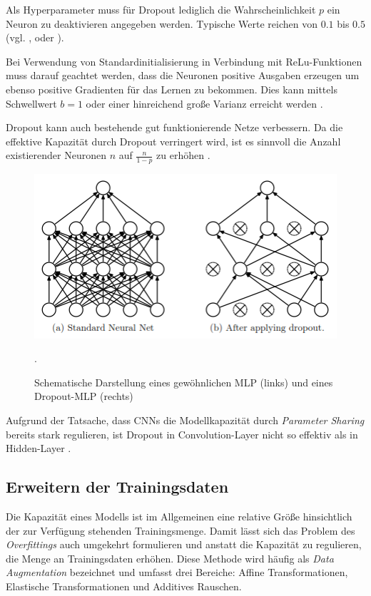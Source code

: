 Als Hyperparameter muss für Dropout lediglich die Wahrscheinlichkeit $p$ ein Neuron zu deaktivieren angegeben werden. Typische Werte reichen von $0.1$ bis $0.5$ (vgl. \cite{Krizhevsky2012}, \cite{Srivastava2014} oder \cite{Simonyan2014}).

Bei Verwendung von Standardinitialisierung in Verbindung mit ReLu-Funk\-tionen muss darauf geachtet werden, dass die Neuronen positive Ausgaben erzeugen um ebenso positive Gradienten für das Lernen zu bekommen. Dies kann mittels Schwellwert $b=1$ oder einer hinreichend große Varianz erreicht werden \cite[vgl.][]{Hinton2012}.

Dropout kann auch bestehende gut funktionierende Netze verbessern. Da die effektive Kapazität durch Dropout verringert wird, ist es sinnvoll die Anzahl existierender Neuronen $n$ auf $\frac{n}{1-p}$ zu erhöhen \cite[vgl.][]{Srivastava2014}.\\ 

\begin{figure}
\centering
\includegraphics[width=0.6\linewidth]{images/4_dropout}
\caption[]{Schematische Darstellung eines gewöhnlichen MLP (links) und eines Dropout-MLP (rechts) \cite[siehe][]{Srivastava2014}}.
\label{fig:4_dropout}
\end{figure}			
	
Aufgrund der Tatsache, dass CNNs die Modellkapazität durch \textit{Parameter Sharing} bereits stark regulieren, ist Dropout in Convolution-Layer nicht so effektiv als in Hidden-Layer \cite[vgl.][]{Hinton2012}.	
			
\subsection{Erweitern der Trainingsdaten}
Die Kapazität eines Modells ist im Allgemeinen eine relative Größe hinsichtlich der zur Verfügung stehenden Trainingsmenge. Damit lässt sich das Problem des \textit{Overfittings} auch umgekehrt formulieren und anstatt die Kapazität zu regulieren, die Menge an Trainingsdaten erhöhen. Diese Methode wird häufig als \textit{Data Augmentation} bezeichnet und umfasst drei Bereiche: Affine Transformationen, Elastische Transformationen und Additives Rauschen.

